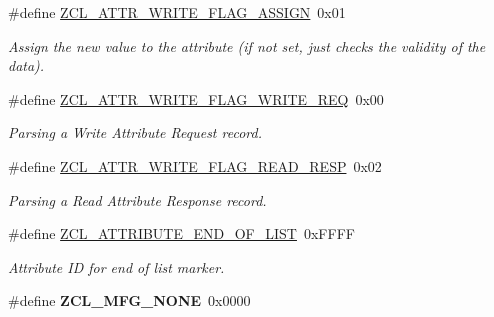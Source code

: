 \begin{DoxyCompactItemize}
\#define \hyperlink{group__zcl_ga2bb65a6c04a14957000feaa12de9769c}{Z\+C\+L\+\_\+\+A\+T\+T\+R\+\_\+\+W\+R\+I\+T\+E\+\_\+\+F\+L\+A\+G\+\_\+\+A\+S\+S\+I\+GN}~0x01
\begin{DoxyCompactList}\small\item\em Assign the new value to the attribute (if not set, just checks the validity of the data). \end{DoxyCompactList}\item 
\mbox{\label{group__zcl_gadf9cb5a2dc8c96c57fbfafe48247256a}} 
\#define \hyperlink{group__zcl_gadf9cb5a2dc8c96c57fbfafe48247256a}{Z\+C\+L\+\_\+\+A\+T\+T\+R\+\_\+\+W\+R\+I\+T\+E\+\_\+\+F\+L\+A\+G\+\_\+\+W\+R\+I\+T\+E\+\_\+\+R\+EQ}~0x00
\begin{DoxyCompactList}\small\item\em Parsing a Write Attribute Request record. \end{DoxyCompactList}\item 
\mbox{\label{group__zcl_ga928e86b414e2662235b7bb39ffaf0635}} 
\#define \hyperlink{group__zcl_ga928e86b414e2662235b7bb39ffaf0635}{Z\+C\+L\+\_\+\+A\+T\+T\+R\+\_\+\+W\+R\+I\+T\+E\+\_\+\+F\+L\+A\+G\+\_\+\+R\+E\+A\+D\+\_\+\+R\+E\+SP}~0x02
\begin{DoxyCompactList}\small\item\em Parsing a Read Attribute Response record. \end{DoxyCompactList}\item 
\mbox{\label{group__zcl_gab05da20cf1dfaef97e20dfca2fd26d14}} 
\#define \hyperlink{group__zcl_gab05da20cf1dfaef97e20dfca2fd26d14}{Z\+C\+L\+\_\+\+A\+T\+T\+R\+I\+B\+U\+T\+E\+\_\+\+E\+N\+D\+\_\+\+O\+F\+\_\+\+L\+I\+ST}~0x\+F\+F\+FF
\begin{DoxyCompactList}\small\item\em Attribute ID for end of list marker. \end{DoxyCompactList}\item 
\mbox{\label{group__zcl_ga7966bd513458cfd80b13a81512712cd8}} 
\#define {\bfseries Z\+C\+L\+\_\+\+M\+F\+G\+\_\+\+N\+O\+NE}~0x0000
\end{DoxyCompactItemize}
